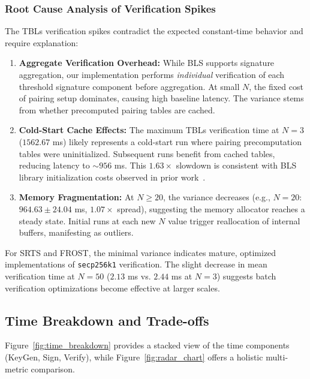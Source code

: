 \subsubsection{Root Cause Analysis of Verification Spikes}
\label{subsubsec:verification_spike_analysis}

The TBLs verification spikes contradict the expected constant-time behavior and require explanation:

\begin{enumerate}
    \item \textbf{Aggregate Verification Overhead:} While BLS supports signature aggregation, our implementation performs \textit{individual} verification of each threshold signature component before aggregation. At small $N$, the fixed cost of pairing setup dominates, causing high baseline latency. The variance stems from whether precomputed pairing tables are cached.
    
    \item \textbf{Cold-Start Cache Effects:} The maximum TBLs verification time at $N=3$ ($1562.67$ ms) likely represents a cold-start run where pairing precomputation tables were uninitialized. Subsequent runs benefit from cached tables, reducing latency to $\sim 956$ ms. This $1.63\times$ slowdown is consistent with BLS library initialization costs observed in prior work~\cite{bls_benchmarks}.
    
    \item \textbf{Memory Fragmentation:} At $N \geq 20$, the variance decreases (e.g., $N=20$: $964.63 \pm 24.04$ ms, $1.07\times$ spread), suggesting the memory allocator reaches a steady state. Initial runs at each new $N$ value trigger reallocation of internal buffers, manifesting as outliers.
\end{enumerate}

For SRTS and FROST, the minimal variance indicates mature, optimized implementations of \texttt{secp256k1} verification. The slight decrease in mean verification time at $N=50$ ($2.13$ ms vs. $2.44$ ms at $N=3$) suggests batch verification optimizations become effective at larger scales.

\subsection{Time Breakdown and Trade-offs}
\label{subsec:time_breakdown}

Figure~\ref{fig:time_breakdown} provides a stacked view of the time components (KeyGen, Sign, Verify), while Figure~\ref{fig:radar_chart} offers a holistic multi-metric comparison.


